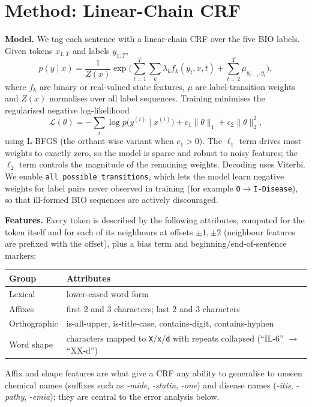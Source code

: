 \documentclass[10pt,a4paper]{article}
\begin{document}
\section{Method: Linear-Chain CRF}\label{sec:method}
\textbf{Model.} We tag each sentence with a linear-chain CRF \cite{lafferty2001crf} over the five BIO labels. Given tokens $x_{1:T}$ and labels $y_{1:T}$,
\begin{equation}
p(y\mid x)=\frac{1}{Z(x)}\exp\Big(\sum_{t=1}^{T}\sum_{k}\lambda_k f_k(y_t,x,t)+\sum_{t=2}^{T}\mu_{y_{t-1},y_t}\Big),
\end{equation}
where $f_k$ are binary or real-valued state features, $\mu$ are label-transition weights and $Z(x)$ normalises over all label sequences.
Training minimises the regularised negative log-likelihood
\begin{equation}
\mathcal{L}(\theta)=-\sum_{i}\log p\big(y^{(i)}\mid x^{(i)}\big)+c_1\lVert\theta\rVert_1+c_2\lVert\theta\rVert_2^2 ,
\end{equation}
using L-BFGS (the orthant-wise variant when $c_1>0$). The $\ell_1$ term drives most weights to exactly zero, so the model is sparse and robust to noisy features;
the $\ell_2$ term controls the magnitude of the remaining weights. Decoding uses Viterbi. We enable \texttt{all\_possible\_transitions}, which lets the model learn negative weights for
label pairs never observed in training (for example \texttt{O}$\rightarrow$\texttt{I-Disease}), so that ill-formed BIO sequences are actively discouraged.

\textbf{Features.} Every token is described by the following attributes, computed for the token itself and for each of its neighbours at offsets $\pm1,\pm2$
(neighbour features are prefixed with the offset), plus a bias term and beginning/end-of-sentence markers:
\begin{center}\small
\begin{tabular}{@{}ll@{}}
\toprule
Group & Attributes \\
\midrule
Lexical & lower-cased word form \\
Affixes & first 2 and 3 characters; last 2 and 3 characters \\
Orthographic & is-all-upper, is-title-case, contains-digit, contains-hyphen \\
Word shape & characters mapped to \texttt{X}/\texttt{x}/\texttt{d} with repeats collapsed (``IL-6'' $\rightarrow$ ``XX-d'') \\
\bottomrule
\end{tabular}
\end{center}
Affix and shape features are what give a CRF any ability to generalise to unseen chemical names (suffixes such as \emph{-mide}, \emph{-statin}, \emph{-one})
and disease names (\emph{-itis}, \emph{-pathy}, \emph{-emia}); they are central to the error analysis below.
\end{document}
